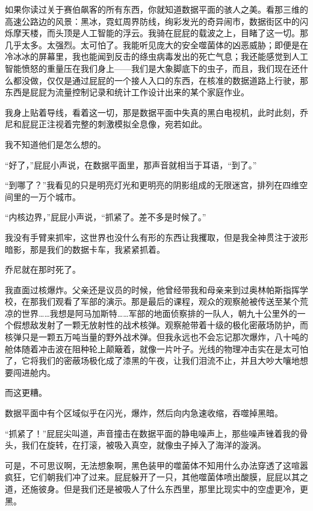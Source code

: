 \documentclass[AutoFakeBold=true]{book}
\begin{document}
\vspace*{1em}

如果你读过关于赛伯飙客的所有东西，你就知道数据平面的骇人之美。看那三维的高速公路边的风景：黑冰，霓虹周界防线，绚彩发光的奇异闹市，数据街区中的闪烁摩天楼，而头顶是人工智能的浮云。我骑在屁屁的载波之上，目睹了这一切。那几乎太多。太强烈。太可怕了。我能听见庞大的安全噬菌体的凶恶威胁；即便是在冷冰冰的屏幕里，我也能闻到反击的绦虫病毒发出的死亡气息；我还能感觉到人工智能愤怒的重量压在我们身上——我们是大象脚底下的虫子，而且，我们现在还什么都没做，仅仅是通过屁屁的一个接人入口的东西，在核准的数据道路上行驶，那东西是屁屁为流量控制记录和统计工作设计出来的某个家庭作业。

我身上贴着导线，看着这一切，那是数据平面中失真的黑白电视机，此时此刻，乔尼和屁屁正注视着完整的刺激模拟全息像，宛若如此。

我不知道他们是怎么想的。

``好了，''屁屁小声说，在数据平面里，那声音就相当于耳语，``到了。''

``到哪了？''我看见的只是明亮灯光和更明亮的阴影组成的无限迷宫，排列在四维空间里的一万个城市。

``内核边界，''屁屁小声说，``抓紧了。差不多是时候了。''

我没有手臂来抓牢，这世界也没什么有形的东西让我攫取，但是我全神贯注于波形暗影，那是我们的数据卡车，{\kaishu 我紧紧抓着。}

乔尼就在那时死了。

我直面过核爆炸。父亲还是议员的时候，他曾经带我和母亲来到过奥林帕斯指挥学校，在那我们观看了军部的演示。那是最后的课程，观众的观察舱被传送至某个荒凉的世界……我想是阿马加斯特……军部的地面侦察排的一队人，朝九十公里外的一个假想敌发射了一颗无放射性的战术核弹。观察舱带着十级的极化密蔽场防护，而核弹只是一颗五万吨当量的野外战术弹。但我永远也不会忘记那次爆炸，八十吨的舱体随着冲击波在阻种轮上颠簸着，就像一片叶子。光线的物理冲击实在是太可怕了，它将我们的密蔽场极化成了漆黑的午夜，让我们泪流不止，并且大吵大嚷地想要闯进舱内。

而这更糟。

数据平面中有个区域似乎在闪光，爆炸，然后向内急速收缩，吞噬掉黑暗。

``抓紧了！''屁屁尖叫道，声音撞击在数据平面的静电噪声上，那些噪声锉着我的骨头，我们在旋转，在打滚，被吸入真空，就像虫子掉入了海洋的漩涡。

可是，不可思议啊，无法想象啊，黑色装甲的噬菌体不知用什么办法穿透了这喧嚣疯狂，它们朝我们冲了过来。屁屁躲开了一只，其他噬菌体喷出酸膜，屁屁以其之道，还施彼身。但是我们还是被吸人了什么东西里，那里比现实中的空虚更冷，更黑。
\end{document}
